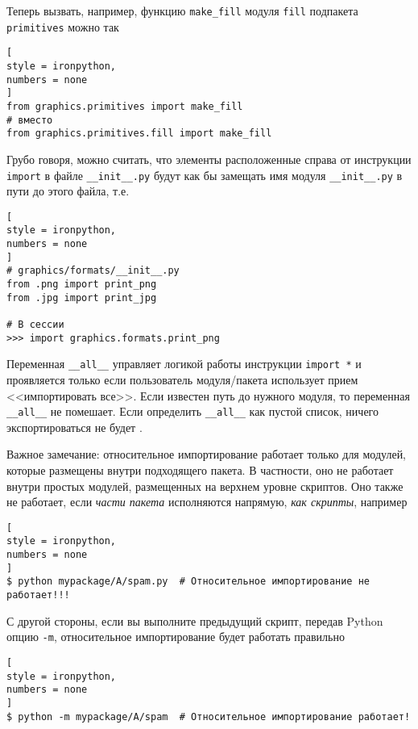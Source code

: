 \documentclass[%
	11pt,
	a4paper,
	utf8,
		]{article}
\begin{document}
Теперь вызвать, например, функцию \texttt{make\_fill} модуля \texttt{fill} подпакета \texttt{primitives} можно так
\begin{lstlisting}[
style = ironpython,
numbers = none
]
from graphics.primitives import make_fill
# вместо
from graphics.primitives.fill import make_fill
\end{lstlisting}

Грубо говоря, можно считать, что элементы расположенные справа от инструкции \texttt{import} в файле \verb|__init__.py| будут как бы замещать имя модуля \verb|__init__.py| в пути до этого файла, т.е.
\begin{lstlisting}[
style = ironpython,
numbers = none
]
# graphics/formats/__init__.py
from .png import print_png
from .jpg import print_jpg

# В сессии
>>> import graphics.formats.print_png
\end{lstlisting}

Переменная \verb|__all__| управляет логикой работы инструкции \verb|import *| и проявляется только если пользователь модуля/пакета использует прием <<импортировать все>>. Если известен путь до нужного модуля, то переменная \verb|__all__| не помешает. Если определить \verb|__all__| как пустой список, ничего экспортироваться не будет \cite[]{beazley:python_cookbook-2019}.

Важное замечание: относительное импортирование работает только для модулей, которые размещены внутри подходящего пакета. В частности, оно не работает внутри простых модулей, размещенных на верхнем уровне скриптов. Оно также не работает, если \emph{части пакета} исполняются напрямую, \emph{как скрипты}, например \cite[]{beazley:python_cookbook-2019}
\begin{lstlisting}[
style = ironpython,
numbers = none
]
$ python mypackage/A/spam.py  # Относительное импортирование не работает!!!
\end{lstlisting}

С другой стороны, если вы выполните предыдущий скрипт, передав Python опцию \verb|-m|, относительное импортирование будет работать правильно
\begin{lstlisting}[
style = ironpython,
numbers = none
]
$ python -m mypackage/A/spam  # Относительное импортирование работает!
\end{lstlisting}

\end{document}
